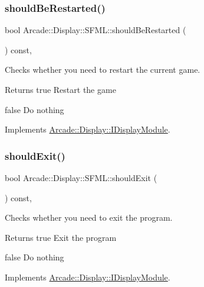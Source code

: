 \subsubsection{\texorpdfstring{shouldBeRestarted()}{shouldBeRestarted()}}
{\footnotesize\ttfamily bool Arcade\+::\+Display\+::\+S\+F\+M\+L\+::should\+Be\+Restarted (\begin{DoxyParamCaption}{ }\end{DoxyParamCaption}) const\hspace{0.3cm}{\ttfamily [final]}, {\ttfamily [virtual]}}



Checks whether you need to restart the current game. 

\begin{DoxyReturn}{Returns}
true Restart the game 

false Do nothing 
\end{DoxyReturn}


Implements \mbox{\hyperlink{classArcade_1_1Display_1_1IDisplayModule_adc5d499229aa5899bbd4bae14f00cb27}{Arcade\+::\+Display\+::\+I\+Display\+Module}}.

\mbox{\label{classArcade_1_1Display_1_1SFML_a780a71713551c8dffd1f008802f96767}} 
\subsubsection{\texorpdfstring{shouldExit()}{shouldExit()}}
{\footnotesize\ttfamily bool Arcade\+::\+Display\+::\+S\+F\+M\+L\+::should\+Exit (\begin{DoxyParamCaption}{ }\end{DoxyParamCaption}) const\hspace{0.3cm}{\ttfamily [final]}, {\ttfamily [virtual]}}



Checks whether you need to exit the program. 

\begin{DoxyReturn}{Returns}
true Exit the program 

false Do nothing 
\end{DoxyReturn}


Implements \mbox{\hyperlink{classArcade_1_1Display_1_1IDisplayModule_a550877fb92d58325404b9ebe9e71f6ff}{Arcade\+::\+Display\+::\+I\+Display\+Module}}.

